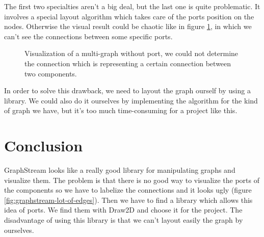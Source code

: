 The first two specialties aren't a big deal, but the last one is quite
problematic. It involves a special layout algorithm which takes care of the ports
position on the nodes. Otherwise the visual result could be chaotic like in
figure \ref{fig:multigraph-no-port}, in which we can't see the connections
between some specific ports.

\begin{figure}[H]
  \centering
  \caption[Visualization of a multi-graph without port]{Visualization of a
    multi-graph without port, we could not determine the connection which is
    representing a certain connection between two components.}
  \label{fig:multigraph-no-port}
\end{figure}

In order to solve this drawback, we need to layout the graph ourself by using a
library. We could also do it ourselves by implementing the algorithm for the kind
of graph we have, but it's too much time-consuming for a project like this.

\section{Conclusion}
\label{sec:viewing-library-conclusion}

GraphStream looks like a really good library for manipulating graphs and visualize
them. The problem is that there is no good way to visualize the ports of the
components so we have to labelize the connections and it looks ugly (figure
\ref{fig:graphstream-lot-of-edges}). Then we have to find a library which allows
this idea of ports. We find them with Draw2D and choose it for the project. The
disadvantage of using this library is that we can't layout easily the graph by
ourselves.

